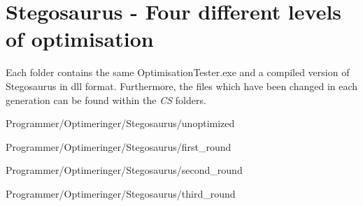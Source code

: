 \chapter{Stegosaurus - Four different levels of optimisation}
\label{app:E}
Each folder contains the same OptimisationTester.exe and a compiled version of Stegosaurus in dll format.
Furthermore, the files which have been changed in each generation can be found within the \textit{CS} folders.

Programmer/Optimeringer/Stegosaurus/unoptimized

Programmer/Optimeringer/Stegosaurus/first_round

Programmer/Optimeringer/Stegosaurus/second_round

Programmer/Optimeringer/Stegosaurus/third_round

